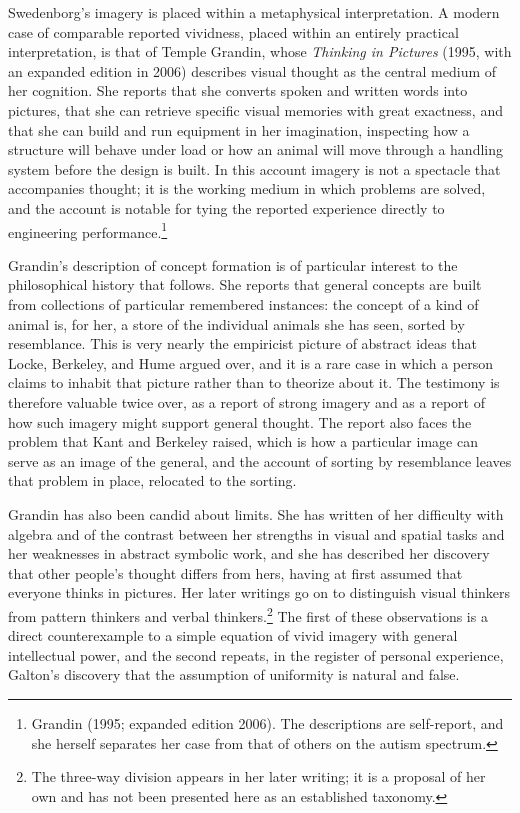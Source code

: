 \documentclass[11pt]{article}
\theoremstyle{remark}
\begin{document}
Swedenborg's imagery is placed within a metaphysical interpretation. A modern case of comparable reported vividness, placed within an entirely practical interpretation, is that of Temple Grandin, whose \emph{Thinking in Pictures} (1995, with an expanded edition in 2006) describes visual thought as the central medium of her cognition. She reports that she converts spoken and written words into pictures, that she can retrieve specific visual memories with great exactness, and that she can build and run equipment in her imagination, inspecting how a structure will behave under load or how an animal will move through a handling system before the design is built. In this account imagery is not a spectacle that accompanies thought; it is the working medium in which problems are solved, and the account is notable for tying the reported experience directly to engineering performance.\footnote{Grandin (1995; expanded edition 2006). The descriptions are self-report, and she herself separates her case from that of others on the autism spectrum.}

Grandin's description of concept formation is of particular interest to the philosophical history that follows. She reports that general concepts are built from collections of particular remembered instances: the concept of a kind of animal is, for her, a store of the individual animals she has seen, sorted by resemblance. This is very nearly the empiricist picture of abstract ideas that Locke, Berkeley, and Hume argued over, and it is a rare case in which a person claims to inhabit that picture rather than to theorize about it. The testimony is therefore valuable twice over, as a report of strong imagery and as a report of how such imagery might support general thought. The report also faces the problem that Kant and Berkeley raised, which is how a particular image can serve as an image of the general, and the account of sorting by resemblance leaves that problem in place, relocated to the sorting.

Grandin has also been candid about limits. She has written of her difficulty with algebra and of the contrast between her strengths in visual and spatial tasks and her weaknesses in abstract symbolic work, and she has described her discovery that other people's thought differs from hers, having at first assumed that everyone thinks in pictures. Her later writings go on to distinguish visual thinkers from pattern thinkers and verbal thinkers.\footnote{The three-way division appears in her later writing; it is a proposal of her own and has not been presented here as an established taxonomy.} The first of these observations is a direct counterexample to a simple equation of vivid imagery with general intellectual power, and the second repeats, in the register of personal experience, Galton's discovery that the assumption of uniformity is natural and false.
\end{document}
